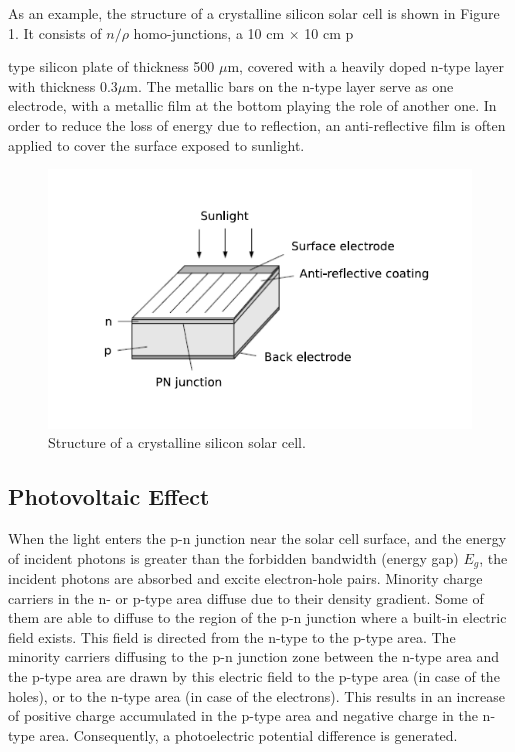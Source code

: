 \documentclass{article}
\begin{document}
As an example, the structure of a crystalline silicon solar cell is shown in Figure 1. It
consists of $n/\rho$ homo-junctions, a 10 cm $\times$ 10 cm p{type silicon plate of thickness 500 $\mu$m,
covered with a heavily doped n-type layer with thickness 0.3$\mu$m. The metallic bars on
the n-type layer serve as one electrode, with a metallic film at the bottom playing the role
of another one. In order to reduce the loss of energy due to reflection, an anti-reflective film is often applied to cover the surface exposed to sunlight.

\begin{figure}[H]
	\centering
	\includegraphics[scale=0.4]{fig1.png}
	\caption{Structure of a crystalline silicon solar cell.}
\end{figure}

\subsection{Photovoltaic Effect}

When the light enters the p-n junction near the solar cell surface, and the energy of
incident photons is greater than the forbidden bandwidth (energy gap) $E_g$, the incident
photons are absorbed and excite electron-hole pairs. Minority charge carriers in the n- or
p-type area diffuse due to their density gradient. Some of them are able to diffuse to the
region of the p-n junction where a built-in electric field exists. This field is directed from
the n-type to the p-type area. The minority carriers diffusing to the p-n junction zone
between the n-type area and the p-type area are drawn by this electric field to the p-type
area (in case of the holes), or to the n-type area (in case of the electrons). This results in
an increase of positive charge accumulated in the p-type area and negative charge in the
n-type area. Consequently, a photoelectric potential difference is generated.\\

}
\end{document}
